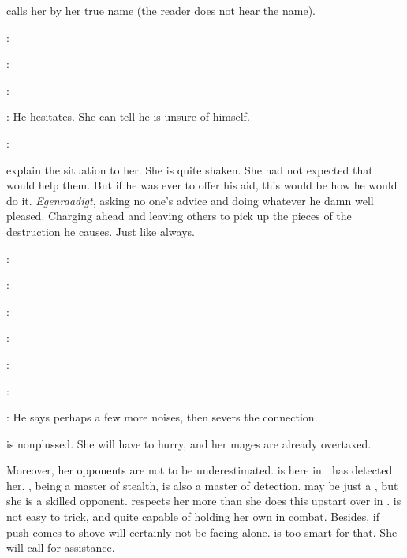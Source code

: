 \Psyrex calls her by her true name (the reader does not hear the name).

\Takestsha:

\Psyrex:

\Takestsha:

\Psyrex:
He hesitates.
She can tell he is unsure of himself.


\Psyrex:


\Psyrex explain the situation to her. 
She is quite shaken.
She had not expected that \Ishnaruchaefir would help them.
But if he was ever to offer his aid, this would be how he would do it.
\emph{Egenraadigt}, asking no one's advice and doing whatever he damn well pleased. 
Charging ahead and leaving others to pick up the pieces of the destruction he causes.
Just like always. 

\Psyrex:

\Takestsha:

\Psyrex:

\Takestsha:

\Psyrex:

\Takestsha:

\Psyrex:
He says perhaps a few more noises, then severs the connection. 

\begin{comment}
  \subsection{Takestsha thinks about her task}
\end{comment}

\Takestsha is nonplussed.
She will have to hurry, and her mages are already overtaxed. 

Moreover, her opponents are not to be underestimated.
\Achsah is here in \Forclin. 
\Takestsha has detected her. 
\Takestsha, being a master of stealth, is also a master of detection. 
\Achsah may be just a \bezed, but she is a skilled opponent. 
\Takestsha respects her more than she does this upstart \Teshrial over in \Malcur. 
\Achsah is not easy to trick, and quite capable of holding her own in combat. 
Besides, if push comes to shove \Takestsha will certainly not be facing \Achsah alone. 
\Achsah is too smart for that.
She will call for assistance. 

